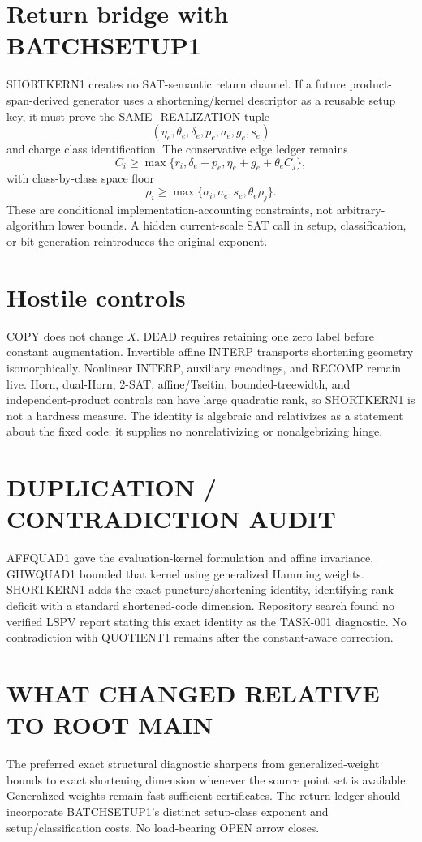 \documentclass[11pt]{article}
\begin{document}
\section*{Return bridge with BATCHSETUP1}
SHORTKERN1 creates no SAT-semantic return channel. If a future product-span-derived generator uses a shortening/kernel descriptor as a reusable setup key, it must prove the SAME_REALIZATION tuple
\[
(\eta_e,\theta_e,\delta_e,p_e,a_e,g_e,s_e)
\]
and charge class identification. The conservative edge ledger remains
\[
C_i\ge\max\{r_i,\delta_e+p_e,\eta_e+g_e+\theta_e C_j\},
\]
with class-by-class space floor
\[
\rho_i\ge\max\{\sigma_i,a_e,s_e,\theta_e\rho_j\}.
\]
These are conditional implementation-accounting constraints, not arbitrary-algorithm lower bounds. A hidden current-scale SAT call in setup, classification, or bit generation reintroduces the original exponent.

\section*{Hostile controls}
COPY does not change \(X\). DEAD requires retaining one zero label before constant augmentation. Invertible affine INTERP transports shortening geometry isomorphically. Nonlinear INTERP, auxiliary encodings, and RECOMP remain live. Horn, dual-Horn, 2-SAT, affine/Tseitin, bounded-treewidth, and independent-product controls can have large quadratic rank, so SHORTKERN1 is not a hardness measure. The identity is algebraic and relativizes as a statement about the fixed code; it supplies no nonrelativizing or nonalgebrizing hinge.

\section*{DUPLICATION / CONTRADICTION AUDIT}
AFFQUAD1 gave the evaluation-kernel formulation and affine invariance. GHWQUAD1 bounded that kernel using generalized Hamming weights. SHORTKERN1 adds the exact puncture/shortening identity, identifying rank deficit with a standard shortened-code dimension. Repository search found no verified LSPV report stating this exact identity as the TASK-001 diagnostic. No contradiction with QUOTIENT1 remains after the constant-aware correction.

\section*{WHAT CHANGED RELATIVE TO ROOT MAIN}
The preferred exact structural diagnostic sharpens from generalized-weight bounds to exact shortening dimension whenever the source point set is available. Generalized weights remain fast sufficient certificates. The return ledger should incorporate BATCHSETUP1's distinct setup-class exponent and setup/classification costs. No load-bearing OPEN arrow closes.
\end{document}
